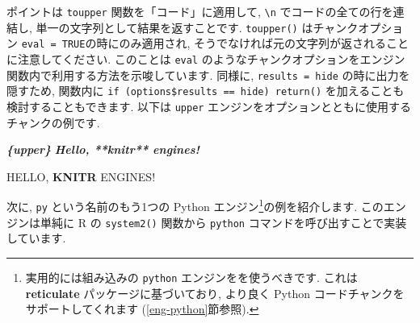 \documentclass[
  11pt,
]{bxjsreport}
\newenvironment{Shaded}{\begin{snugshade}}{\end{snugshade}}
\newcommand{\AttributeTok}[1]{\textcolor[rgb]{0.77,0.63,0.00}{#1}}
\newcommand{\ConstantTok}[1]{\textcolor[rgb]{0.00,0.00,0.00}{#1}}
\newcommand{\ControlFlowTok}[1]{\textcolor[rgb]{0.13,0.29,0.53}{\textbf{#1}}}
\newcommand{\FunctionTok}[1]{\textcolor[rgb]{0.00,0.00,0.00}{#1}}
\newcommand{\InformationTok}[1]{\textcolor[rgb]{0.56,0.35,0.01}{\textbf{\textit{#1}}}}
\newcommand{\NormalTok}[1]{#1}
\newcommand{\OtherTok}[1]{\textcolor[rgb]{0.56,0.35,0.01}{#1}}
\newcommand{\SpecialCharTok}[1]{\textcolor[rgb]{0.00,0.00,0.00}{#1}}
\newcommand{\StringTok}[1]{\textcolor[rgb]{0.31,0.60,0.02}{#1}}
\renewenvironment{quote}{\begin{VF}}{\end{VF}}
\renewenvironment{quote}{\def\FrameCommand{{\color{quotebarcolor}{\vrule width 3pt}}\hspace{10pt}}\MakeFramed{\advance\hsize-\width\FrameRestore}}{\endMakeFramed}
\begin{document}
ポイントは \texttt{toupper} 関数を「コード」に適用して, \texttt{\textbackslash{}n} でコードの全ての行を連結し, 単一の文字列として結果を返すことです. \texttt{toupper()} はチャンクオプション \texttt{eval = TRUE}の時にのみ適用され, そうでなければ元の文字列が返されることに注意してください. このことは \texttt{eval} のようなチャンクオプションをエンジン関数内で利用する方法を示唆しています. 同様に, \texttt{results = \textquotesingle{}hide\textquotesingle{}} の時に出力を隠すため, 関数内に \texttt{if (options\$results == \textquotesingle{}hide\textquotesingle{})\ return()} を加えることも検討することもできます. 以下は \texttt{upper} エンジンをオプションとともに使用するチャンクの例です.

\begin{quote}
\begin{Shaded}
\begin{Highlighting}[]
\InformationTok{\textasciigrave{}\textasciigrave{}\textasciigrave{}\{upper\}}
\InformationTok{Hello, **knitr** engines!}
\InformationTok{\textasciigrave{}\textasciigrave{}\textasciigrave{}}
\end{Highlighting}
\end{Shaded}

HELLO, \textbf{KNITR} ENGINES!
\end{quote}

次に, \texttt{py} という名前のもう1つの Python エンジン\footnote{実用的には組み込みの \texttt{python} エンジンをを使うべきです. これは \textbf{reticulate} パッケージに基づいており, より良く Python コードチャンクをサポートしてくれます (\ref{eng-python}節参照).}の例を紹介します. このエンジンは単純に R の \texttt{system2()} 関数から \texttt{python} コマンドを呼び出すことで実装しています.

\begin{Shaded}
\end{Shaded}
\end{document}
